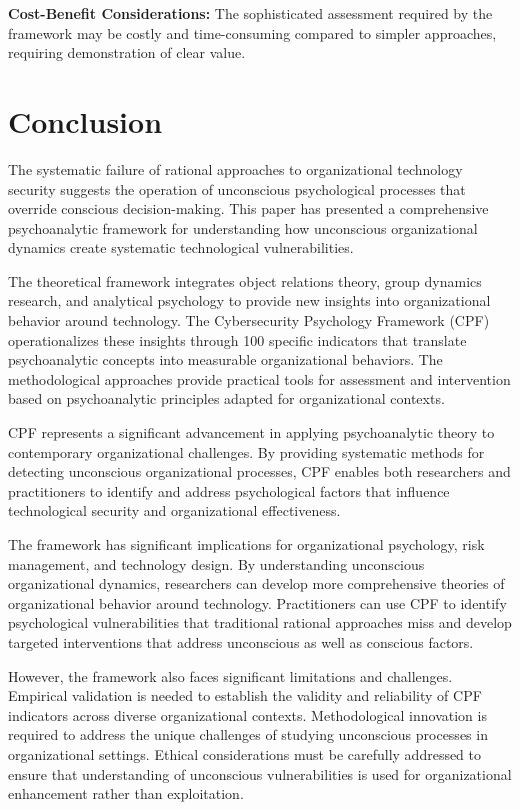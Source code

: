 \documentclass[10pt, twocolumn]{article}
\begin{document}
\textbf{Cost-Benefit Considerations:} The sophisticated assessment required by the framework may be costly and time-consuming compared to simpler approaches, requiring demonstration of clear value.

\section{Conclusion}

The systematic failure of rational approaches to organizational technology security suggests the operation of unconscious psychological processes that override conscious decision-making. This paper has presented a comprehensive psychoanalytic framework for understanding how unconscious organizational dynamics create systematic technological vulnerabilities.

The theoretical framework integrates object relations theory, group dynamics research, and analytical psychology to provide new insights into organizational behavior around technology. The Cybersecurity Psychology Framework (CPF) operationalizes these insights through 100 specific indicators that translate psychoanalytic concepts into measurable organizational behaviors. The methodological approaches provide practical tools for assessment and intervention based on psychoanalytic principles adapted for organizational contexts.

CPF represents a significant advancement in applying psychoanalytic theory to contemporary organizational challenges. By providing systematic methods for detecting unconscious organizational processes, CPF enables both researchers and practitioners to identify and address psychological factors that influence technological security and organizational effectiveness.

The framework has significant implications for organizational psychology, risk management, and technology design. By understanding unconscious organizational dynamics, researchers can develop more comprehensive theories of organizational behavior around technology. Practitioners can use CPF to identify psychological vulnerabilities that traditional rational approaches miss and develop targeted interventions that address unconscious as well as conscious factors.

However, the framework also faces significant limitations and challenges. Empirical validation is needed to establish the validity and reliability of CPF indicators across diverse organizational contexts. Methodological innovation is required to address the unique challenges of studying unconscious processes in organizational settings. Ethical considerations must be carefully addressed to ensure that understanding of unconscious vulnerabilities is used for organizational enhancement rather than exploitation.
\end{document}
